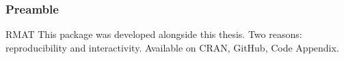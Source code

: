 
\frame{\titlepage}

\begin{frame}
\frametitle{Preamble}

\begin{alertblock}{RMAT}
This package was developed alongside this thesis. Two reasons: reproducibility and interactivity.
Available on CRAN, GitHub, Code Appendix.
\end{alertblock}

\end{frame}
